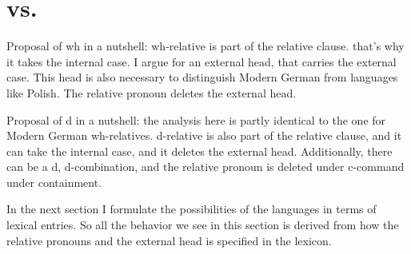 
\chapter{ vs. }\label{ch:relativization}

Proposal of wh in a nutshell: wh-relative is part of the relative clause. that's why it takes the internal case. I argue for an external head, that carries the external case. This head is also necessary to distinguish Modern German from languages like Polish. The relative pronoun deletes the external head.

Proposal of d in a nutshell: the analysis here is partly identical to the one for Modern German wh-relatives. d-relative is also part of the relative clause, and it can take the internal case, and it deletes the external head. Additionally, there can be a d, d-combination, and the relative pronoun is deleted under c-command under containment.

In the next section I formulate the possibilities of the languages in terms of lexical entries. So all the behavior we see in this section is derived from how the relative pronouns and the external head is specified in the lexicon.







